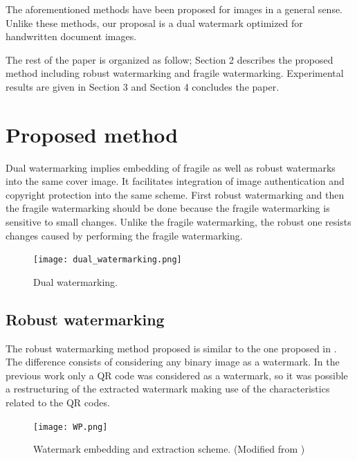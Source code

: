 \documentclass[runningheads]{llncs}
\begin{document}
The aforementioned methods have been proposed for images in a general sense. Unlike these methods, our proposal is a dual watermark optimized for handwritten document images. 

The rest of the paper is organized as follow; Section 2 describes the proposed method including robust watermarking and fragile watermarking. Experimental results are given in Section 3 and Section 4 concludes the paper.

\section{Proposed method}
Dual watermarking implies embedding of fragile as well as robust watermarks into the same cover image. It facilitates integration of image authentication and copyright protection into the same scheme. First robust watermarking and then the fragile watermarking should be done because the fragile watermarking is sensitive to small changes. Unlike the fragile watermarking, the robust one resists changes caused by performing the fragile watermarking.
\begin{figure}
	\begin{center}
		\texttt{[image: dual\_watermarking.png]}
		\caption{Dual watermarking.} \label{dual_watermarking}
	\end{center}
\end{figure}

\subsection{Robust watermarking}
The robust watermarking method proposed is similar to the one proposed in \cite{avila2018watermarking}. The difference consists of considering any binary image as a watermark. In the previous work only a QR code was considered as a watermark, so it was possible a restructuring of the extracted watermark making use of the characteristics related to the QR codes.
\begin{figure}
	\begin{center}
		\texttt{[image: WP.png]}
	\end{center}
	\caption{Watermark embedding and extraction scheme. (Modified from \cite{avila2018watermarking})}
	\label{PIE}
\end{figure}
\end{document}
